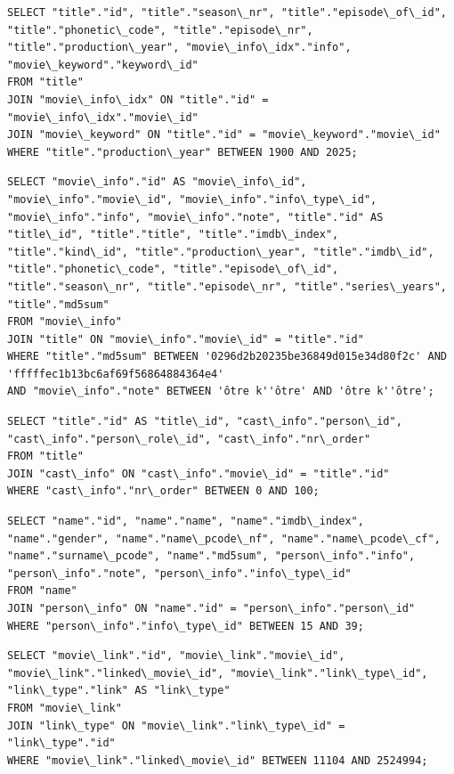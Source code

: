 \begin{appendices}
\begin{lstlisting}[caption={Query 3: Title, Info Index, and Keywords}]
SELECT "title"."id", "title"."season\_nr", "title"."episode\_of\_id", "title"."phonetic\_code", "title"."episode\_nr", "title"."production\_year", "movie\_info\_idx"."info", "movie\_keyword"."keyword\_id" 
FROM "title" 
JOIN "movie\_info\_idx" ON "title"."id" = "movie\_info\_idx"."movie\_id" 
JOIN "movie\_keyword" ON "title"."id" = "movie\_keyword"."movie\_id" 
WHERE "title"."production\_year" BETWEEN 1900 AND 2025;
\end{lstlisting}

\begin{lstlisting}[caption={Query 4: Movie Info and Title Metadata}]
SELECT "movie\_info"."id" AS "movie\_info\_id", "movie\_info"."movie\_id", "movie\_info"."info\_type\_id", "movie\_info"."info", "movie\_info"."note", "title"."id" AS "title\_id", "title"."title", "title"."imdb\_index", "title"."kind\_id", "title"."production\_year", "title"."imdb\_id", "title"."phonetic\_code", "title"."episode\_of\_id", "title"."season\_nr", "title"."episode\_nr", "title"."series\_years", "title"."md5sum" 
FROM "movie\_info" 
JOIN "title" ON "movie\_info"."movie\_id" = "title"."id" 
WHERE "title"."md5sum" BETWEEN '0296d2b20235be36849d015e34d80f2c' AND 'fffffec1b13bc6af69f56864884364e4' 
AND "movie\_info"."note" BETWEEN 'ôtre k''ôtre' AND 'ôtre k''ôtre';
\end{lstlisting}

\begin{lstlisting}[caption={Query 5: Cast Info ordering}]
SELECT "title"."id" AS "title\_id", "cast\_info"."person\_id", "cast\_info"."person\_role\_id", "cast\_info"."nr\_order" 
FROM "title" 
JOIN "cast\_info" ON "cast\_info"."movie\_id" = "title"."id" 
WHERE "cast\_info"."nr\_order" BETWEEN 0 AND 100;
\end{lstlisting}

\begin{lstlisting}[caption={Query 6: Person Info and Name}]
SELECT "name"."id", "name"."name", "name"."imdb\_index", "name"."gender", "name"."name\_pcode\_nf", "name"."name\_pcode\_cf", "name"."surname\_pcode", "name"."md5sum", "person\_info"."info", "person\_info"."note", "person\_info"."info\_type\_id" 
FROM "name" 
JOIN "person\_info" ON "name"."id" = "person\_info"."person\_id" 
WHERE "person\_info"."info\_type\_id" BETWEEN 15 AND 39;
\end{lstlisting}

\begin{lstlisting}[caption={Query 7: Linked Movies}]
SELECT "movie\_link"."id", "movie\_link"."movie\_id", "movie\_link"."linked\_movie\_id", "movie\_link"."link\_type\_id", "link\_type"."link" AS "link\_type" 
FROM "movie\_link" 
JOIN "link\_type" ON "movie\_link"."link\_type\_id" = "link\_type"."id" 
WHERE "movie\_link"."linked\_movie\_id" BETWEEN 11104 AND 2524994;
\end{lstlisting}


\end{appendices}
